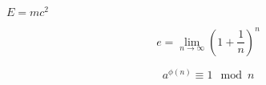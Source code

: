 \documentclass[10pt]{book}
\begin{document}
\begin{mdSnippets}
\begin{mdInlineSnippet}[826676a6a5ad24552f0d5af1593434cc]%
$E=mc^2$\end{mdInlineSnippet}%
\begin{mdDisplaySnippet}[3ddeeecfa9b7b38221c376ed4d89a66b]%
\[%
  e = \lim_{n\rightarrow\infty} (1+\frac1n)^n
\]%
\end{mdDisplaySnippet}%
\begin{mdDisplaySnippet}[3bc7ab68170822b8017ff95637d3f5f4]%
\[%
  a^{\phi(n)} \equiv 1 \mod n
\]%
\end{mdDisplaySnippet}%

\end{mdSnippets}
\end{document}
